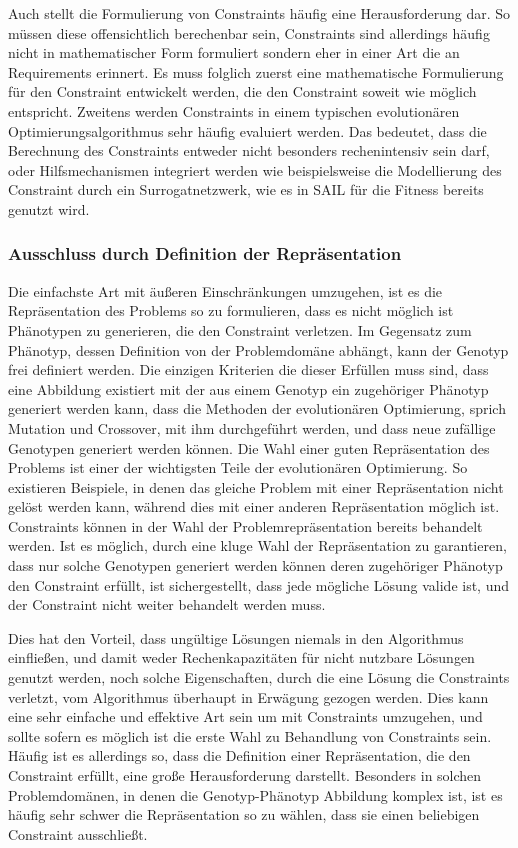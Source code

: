 Auch stellt die Formulierung von Constraints häufig eine Herausforderung dar.
So müssen diese offensichtlich berechenbar sein, Constraints sind allerdings häufig nicht in mathematischer Form formuliert sondern eher in einer Art die an Requirements erinnert.
Es muss folglich zuerst eine mathematische Formulierung für den Constraint entwickelt werden, die den Constraint soweit wie möglich entspricht.
Zweitens werden Constraints in einem typischen evolutionären Optimierungsalgorithmus sehr häufig evaluiert werden. Das bedeutet, dass die Berechnung des Constraints entweder nicht besonders rechenintensiv sein darf, oder Hilfsmechanismen integriert werden wie beispielsweise die Modellierung des Constraint durch ein Surrogatnetzwerk, wie es in SAIL für die Fitness bereits genutzt wird.

\subsubsection{Ausschluss durch Definition der Repräsentation}

Die einfachste Art mit äußeren Einschränkungen umzugehen, ist es die Repräsentation des Problems so zu formulieren, dass es nicht möglich ist Phänotypen zu generieren, die den Constraint verletzen.
Im Gegensatz zum Phänotyp, dessen Definition von der Problemdomäne abhängt, kann der Genotyp frei definiert werden.
Die einzigen Kriterien die dieser Erfüllen muss sind, dass eine Abbildung existiert mit der aus einem Genotyp ein zugehöriger Phänotyp generiert werden kann, dass die Methoden der evolutionären Optimierung, sprich Mutation und Crossover, mit ihm durchgeführt werden, und dass neue zufällige Genotypen generiert werden können.
Die Wahl einer guten Repräsentation des Problems ist einer der wichtigsten Teile der evolutionären Optimierung.
So existieren Beispiele, in denen das gleiche Problem mit einer Repräsentation nicht gelöst werden kann, während dies mit einer anderen Repräsentation möglich ist.
Constraints können in der Wahl der Problemrepräsentation bereits behandelt werden.
Ist es möglich, durch eine kluge Wahl der Repräsentation zu garantieren, dass nur solche Genotypen generiert werden können deren zugehöriger Phänotyp den Constraint erfüllt, ist sichergestellt, dass jede mögliche Lösung valide ist, und der Constraint nicht weiter behandelt werden muss.

Dies hat den Vorteil, dass ungültige Lösungen niemals in den Algorithmus einfließen, und damit weder Rechenkapazitäten für nicht nutzbare Lösungen genutzt werden, noch solche Eigenschaften, durch die eine Lösung die Constraints verletzt, vom Algorithmus überhaupt in Erwägung gezogen werden.
Dies kann eine sehr einfache und effektive Art sein um mit Constraints umzugehen, und sollte sofern es möglich ist die erste Wahl zu Behandlung von Constraints sein.
Häufig ist es allerdings so, dass die Definition einer Repräsentation, die den Constraint erfüllt, eine große Herausforderung darstellt.
Besonders in solchen Problemdomänen, in denen die Genotyp-Phänotyp Abbildung komplex ist, ist es häufig sehr schwer die Repräsentation so zu wählen, dass sie einen beliebigen Constraint ausschließt.

